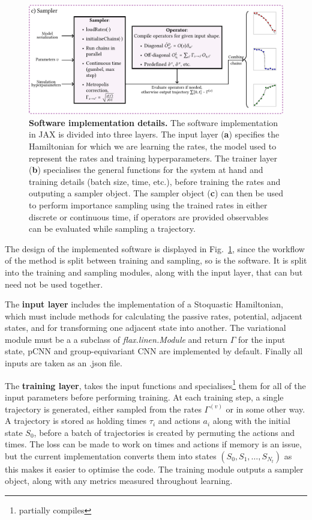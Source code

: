 \begin{figure}[t!]
	\ContinuedFloat
	\centering
	\includegraphics[width=\linewidth]{Chapter4/Figs/Vector/qsampl2}
	\caption[Implementation details]{\textbf{Software implementation details.} The software implementation in JAX is divided into three layers. The input layer (\textbf{a}) specifies the Hamiltonian for which we are learning the rates, the model used to represent the rates and training hyperparameters. The trainer layer (\textbf{b}) specialises the general functions for the system at hand and training details (batch size, time, etc.), before training the rates and outputing a sampler object. The sampler object (\textbf{c}) can then be used to perform importance sampling using the trained rates in either discrete or continuous time, if operators are provided observables can be evaluated while sampling a trajectory.}
	\label{fig:qsampl}
\end{figure}
\noindent
The design of the implemented software is displayed in Fig.~\ref{fig:qsampl}, since the workflow of the method is split between training and sampling, so is the software. It is split into the training and sampling modules, along with the input layer, that can but need not be used together. 

The \textbf{input layer} includes the implementation of a Stoquastic Hamiltonian, which must include methods for calculating the passive rates, potential, adjacent states, and for transforming one adjacent state into another. The variational module must be a a subclass of \emph{flax.linen.Module} and return $\Gamma$ for the input state, pCNN and group-equivariant CNN are implemented by default. Finally all inputs are taken as an .json file. 

The \textbf{training layer}, takes the input functions and specialises\footnote{partially compiles} them for all of the input parameters before performing training. At each training step, a single trajectory is generated, either sampled from the rates $\Gamma^{(v)}$ or in some other way. A trajectory is stored as holding times $\tau_i$ and actions $a_i$ along with the initial state $S_0$, before a batch of trajectories is created by permuting the actions and times. The loss can be made to work on times and actions if memory is an issue, but the current implementation converts them into states $(S_0, S_1, \ldots, S_{N_t})$ as this makes it easier to optimise the code. The training module outputs a sampler object, along with any metrics measured throughout learning. 

